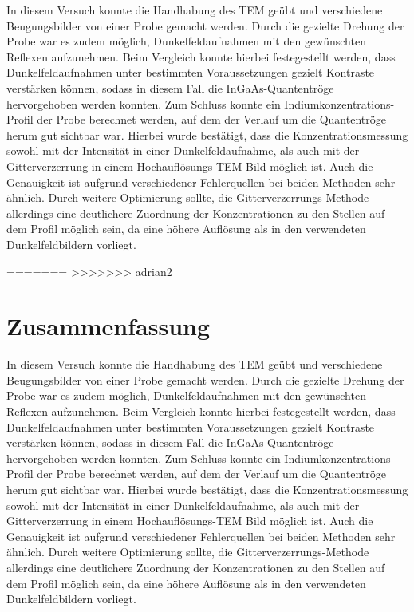\documentclass[a4paper,11pt,DIV=11]{scrartcl}
\begin{document}
In diesem Versuch konnte die Handhabung des TEM geübt und verschiedene Beugungsbilder von einer Probe gemacht werden. Durch die gezielte Drehung der Probe war es zudem möglich, Dunkelfeldaufnahmen mit den gewünschten Reflexen aufzunehmen. Beim Vergleich konnte hierbei festegestellt werden, dass Dunkelfeldaufnahmen unter bestimmten Voraussetzungen gezielt Kontraste verstärken können, sodass in diesem Fall die InGaAs-Quantentröge hervorgehoben werden konnten.
Zum Schluss konnte ein Indiumkonzentrations-Profil der Probe berechnet werden, auf dem der Verlauf um die Quantentröge herum gut sichtbar war. Hierbei wurde bestätigt, dass die Konzentrationsmessung sowohl mit der Intensität in einer Dunkelfeldaufnahme, als auch mit der Gitterverzerrung in einem Hochauflösungs-TEM Bild möglich ist. Auch die Genauigkeit ist aufgrund verschiedener Fehlerquellen bei beiden Methoden sehr ähnlich. Durch weitere Optimierung sollte, die Gitterverzerrungs-Methode allerdings eine deutlichere Zuordnung der Konzentrationen zu den Stellen auf dem Profil möglich sein, da eine höhere Auflösung als in den verwendeten Dunkelfeldbildern vorliegt. 

=======
>>>>>>> adrian2
\section{Zusammenfassung}

In diesem Versuch konnte die Handhabung des TEM geübt und verschiedene Beugungsbilder von einer Probe gemacht werden. Durch die gezielte Drehung der Probe war es zudem möglich, Dunkelfeldaufnahmen mit den gewünschten Reflexen aufzunehmen. Beim Vergleich konnte hierbei festegestellt werden, dass Dunkelfeldaufnahmen unter bestimmten Voraussetzungen gezielt Kontraste verstärken können, sodass in diesem Fall die InGaAs-Quantentröge hervorgehoben werden konnten.
Zum Schluss konnte ein Indiumkonzentrations-Profil der Probe berechnet werden, auf dem der Verlauf um die Quantentröge herum gut sichtbar war. Hierbei wurde bestätigt, dass die Konzentrationsmessung sowohl mit der Intensität in einer Dunkelfeldaufnahme, als auch mit der Gitterverzerrung in einem Hochauflösungs-TEM Bild möglich ist. Auch die Genauigkeit ist aufgrund verschiedener Fehlerquellen bei beiden Methoden sehr ähnlich. Durch weitere Optimierung sollte, die Gitterverzerrungs-Methode allerdings eine deutlichere Zuordnung der Konzentrationen zu den Stellen auf dem Profil möglich sein, da eine höhere Auflösung als in den verwendeten Dunkelfeldbildern vorliegt.
\end{document}
